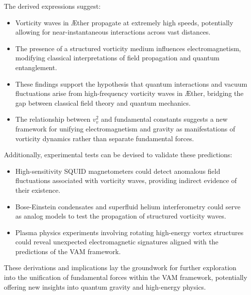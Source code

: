 The derived expressions suggest:

\begin{itemize}
    \item Vorticity waves in Æther propagate at extremely high speeds, potentially allowing for near-instantaneous interactions across vast distances.
    \item The presence of a structured vorticity medium influences electromagnetism, modifying classical interpretations of field propagation and quantum entanglement.
    \item These findings support the hypothesis that quantum interactions and vacuum fluctuations arise from high-frequency vorticity waves in Æther, bridging the gap between classical field theory and quantum mechanics.
    \item The relationship between $v_v^2$ and fundamental constants suggests a new framework for unifying electromagnetism and gravity as manifestations of vorticity dynamics rather than separate fundamental forces.
\end{itemize}

Additionally, experimental tests can be devised to validate these predictions:
\begin{itemize}
    \item High-sensitivity SQUID magnetometers could detect anomalous field fluctuations associated with vorticity waves, providing indirect evidence of their existence.
    \item Bose-Einstein condensates and superfluid helium interferometry could serve as analog models to test the propagation of structured vorticity waves.
    \item Plasma physics experiments involving rotating high-energy vortex structures could reveal unexpected electromagnetic signatures aligned with the predictions of the VAM framework.
\end{itemize}

These derivations and implications lay the groundwork for further exploration into the unification of fundamental forces within the VAM framework, potentially offering new insights into quantum gravity and high-energy physics.